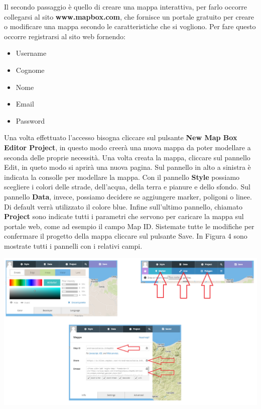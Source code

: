 \documentclass[a4paper,11pt]{article}
\begin{document}
\begin{enumerate}
\begin{enumerate}[label*=\arabic*.]
Il secondo passaggio è quello di creare una mappa interattiva, per farlo occorre collegarsi al sito \textbf{www.mapbox.com}, che fornisce un portale gratuito per creare o modificare una mappa secondo le caratteristiche che si vogliono.\newline
Per fare questo occorre registrarsi al sito web fornendo:
			\smallskip
			\begin{itemize}
				\item Username
				\item Cognome
				\item Nome
				\item Email
				\item Password
			\end{itemize}
			\smallskip
			\medskip
Una volta effettuato l'accesso bisogna cliccare sul pulsante \textbf{New Map Box Editor Project}, in questo modo creerà una nuova mappa da poter modellare a seconda delle proprie necessità.\newline
Una volta creata la mappa, cliccare sul pannello Edit, in queto modo si aprirà una nuova pagina.
Sul pannello in alto a sinistra è indicata la consolle per modellare la mappa. Con il pannello \textbf{Style} possiamo scegliere i colori delle strade, dell'acqua, della terra e pianure e dello sfondo.\newline
Sul pannello \textbf{Data}, invece, possiamo decidere se aggiungere marker, poligoni o linee. Di default verrà utilizzato il colore blue.
Infine sull'ultimo pannello, chiamato \textbf{Project} sono indicate tutti i parametri che servono per caricare la mappa sul portale web, come ad esempio il campo Map ID.
Sistemate tutte le modifiche per confermare il progetto della mappa cliccare sul pulsante Save.\newline
In Figura 4 sono mostrate tutti i pannelli con i relativi campi.
			\begin{center}
				\includegraphics[scale=0.4]{Create_map.png}\newline

\end{center}
\end{enumerate}
\end{enumerate}
\end{document}
